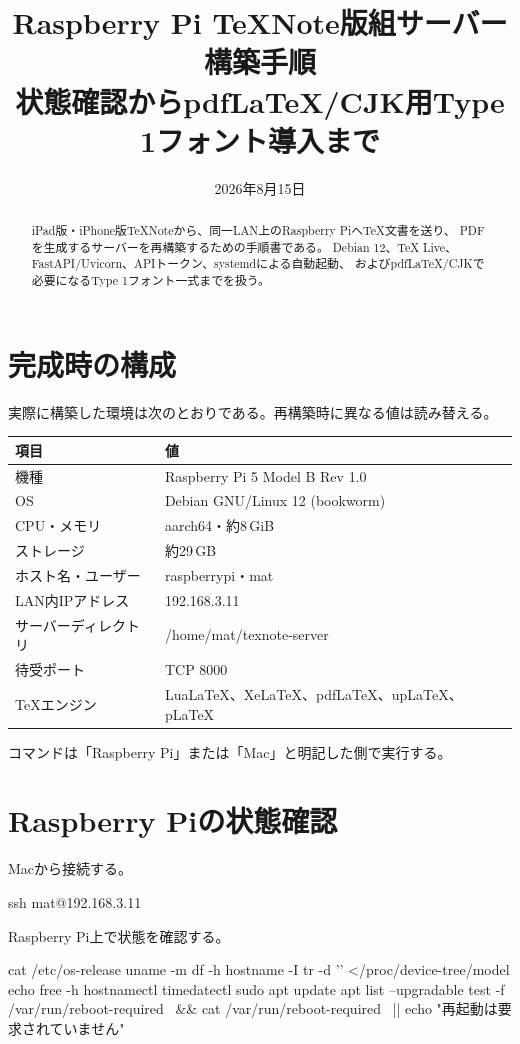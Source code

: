\documentclass[uplatex,a4paper,11pt]{jsarticle}
\title{Raspberry Pi TeXNote版組サーバー構築手順\\
\large 状態確認からpdfLaTeX/CJK用Type 1フォント導入まで}
\author{}\date{2026年8月15日}
\begin{document}
\maketitle
\begin{abstract}
iPad版・iPhone版TeXNoteから、同一LAN上のRaspberry PiへTeX文書を送り、
PDFを生成するサーバーを再構築するための手順書である。
Debian 12、TeX Live、FastAPI/Uvicorn、APIトークン、systemdによる自動起動、
およびpdfLaTeX/CJKで必要になるType 1フォント一式までを扱う。
\end{abstract}
\tableofcontents
\newpage

\section{完成時の構成}

実際に構築した環境は次のとおりである。再構築時に異なる値は読み替える。
\begin{longtable}{@{}ll@{}}
\toprule 項目 & 値\\ \midrule
機種 & Raspberry Pi 5 Model B Rev 1.0\\
OS & Debian GNU/Linux 12 (bookworm)\\
CPU・メモリ & aarch64・約8\,GiB\\
ストレージ & 約29\,GB\\
ホスト名・ユーザー & raspberrypi・mat\\
LAN内IPアドレス & 192.168.3.11\\
サーバーディレクトリ & /home/mat/texnote-server\\
待受ポート & TCP 8000\\
TeXエンジン & LuaLaTeX、XeLaTeX、pdfLaTeX、upLaTeX、pLaTeX\\
\bottomrule
\end{longtable}
コマンドは「Raspberry Pi」または「Mac」と明記した側で実行する。


\section{Raspberry Piの状態確認}
Macから接続する。
\begin{command}
ssh mat@192.168.3.11
\end{command}
Raspberry Pi上で状態を確認する。
\begin{command}
cat /etc/os-release
uname -m
df -h hostname -I
tr -d '\0' </proc/device-tree/model
echo
free -h
hostnamectl
timedatectl
sudo apt update
apt list --upgradable
test -f /var/run/reboot-required \
  && cat /var/run/reboot-required \
  || echo "再起動は要求されていません"
\end{command}
\end{document}
